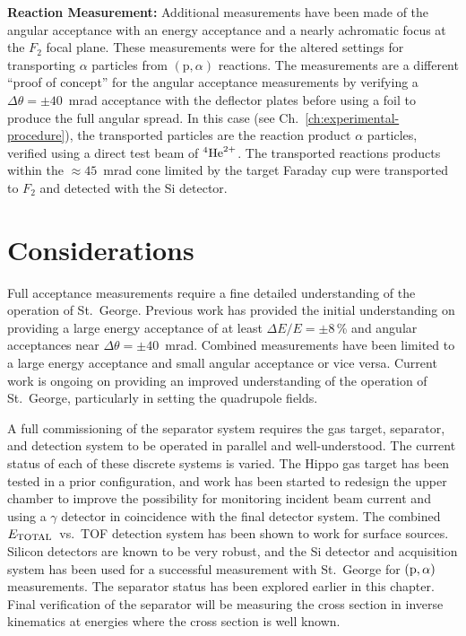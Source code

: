 
\textbf{Reaction Measurement:}
Additional measurements have been made of the angular acceptance with an
energy acceptance and a nearly achromatic focus at the $F_2$ focal
plane. These measurements were for the altered settings for transporting
$\alpha$ particles from $(\textrm{p},\alpha)$ reactions. The
measurements are a different ``proof of concept'' for the angular
acceptance measurements by verifying a $\Delta\theta = \pm 40$~mrad
acceptance with the deflector plates before using a foil to produce the
full angular spread. In this case (see
Ch.~\ref{ch:experimental-procedure}), the transported particles are the
reaction product $\alpha$ particles, verified using a direct test beam
of ${}^{4}\textrm{He}^{2+}$. The transported reactions products within the
$\approx 45$~mrad cone limited by the target Faraday cup were
transported to $F_2$ and detected with the Si detector.


\section{Considerations}

Full acceptance measurements require a fine detailed understanding of
the operation of St.\ George. Previous work has provided the initial
understanding on providing a large energy acceptance of at least $\Delta
E/E = \pm 8$\,\% and angular acceptances near $\Delta\theta = \pm
40$~mrad. Combined measurements have been limited to a large energy
acceptance and small angular acceptance or vice versa. Current work is
ongoing on providing an improved understanding of the operation of St.\
George, particularly in setting the quadrupole fields.

A full commissioning of the separator system requires the gas target,
separator, and detection system to be operated in parallel and
well-understood. The current status of each of these discrete systems is
varied. The Hippo gas target has been tested in a prior configuration,
and work has been started to redesign the upper chamber to improve the
possibility for monitoring incident beam current and using a $\gamma$
detector in coincidence with the final detector system. The combined
$E_{\rm{TOTAL}}$~vs.~TOF detection system has been shown to work for
surface sources. Silicon detectors are known to be very robust, and the
Si detector and acquisition system has been used for a successful
measurement with St.\ George for $(\rm{p},\alpha)$ measurements. The
separator status has been explored earlier in this chapter. Final
verification of the separator will be measuring the
 cross section in
inverse kinematics at energies where the cross section is well known.


